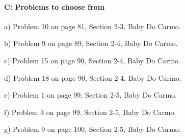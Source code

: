 \documentclass[12pt]{article}
\begin{document}
\paragraph{C: Problems to choose from}
\begin{itemize}
{\item a) Problem 10 on page 81, Section 2-3, Baby Do Carmo.}
{\item b) Problem 9 on page 89, Section 2-4, Baby Do Carmo.}
{\item c) Problem 15 on page 90, Section 2-4, Baby Do Carmo.}
{\item d) Problem 18 on page 90, Section 2-4, Baby Do Carmo.}
{\item e) Problem 1 on page 99, Section 2-5, Baby Do Carmo.}
{\item f) Problem 3 on page 99, Section 2-5, Baby Do Carmo.}
{\item g) Problem 9 on page 100, Section 2-5, Baby Do Carmo.}
\end{itemize}


\end{document}
